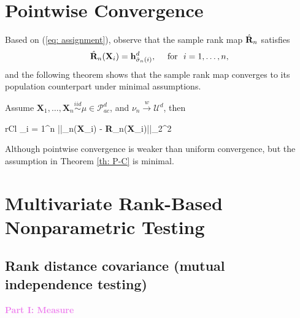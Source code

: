 \section{Pointwise Convergence}
Based on (\ref{eq: assignment}), observe that the sample rank map $\hat{\bf R}_n$ satisfies
\[
\hat{\bf R}_n({\bf X}_i) = \mathbf{h}^d_{\hat{\sigma}_n(i)},  \quad \ \text{for } \ i = 1, \dots, n,
\]
and the following theorem shows that the sample rank map converges to its population counterpart under minimal assumptions. 
\begin{theorem}\label{th: P-C}
	Assume $\mathbf{X}_1, \dots, \mathbf{X}_n \stackrel{iid}\sim \mu \in \mathcal{P}_{ac}^d$, and $\nu_n \stackrel{w}\to \mathcal{U}^d$, then
	\begin{IEEEeqnarray}{rCl}
		\sum_{i = 1}^n ||_n({\bf X}_i) - {\bf R}_n({\bf X}_i)||_{2}^2  \nonumber
	\end{IEEEeqnarray}
\end{theorem}
\begin{remark}
	Although pointwise convergence is weaker than uniform convergence, but the assumption in Theorem \ref{th: P-C} is minimal.
\end{remark}

\section{Multivariate Rank-Based Nonparametric Testing}
\subsection{Rank distance covariance (mutual independence testing)}
\textcolor{violet}{\textbf{Part I: Measure}} 

